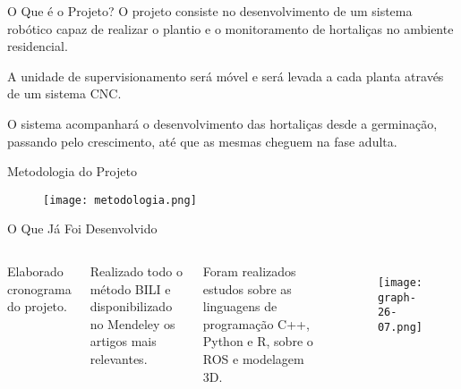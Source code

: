 \begin{frame}[t]{O Que é o Projeto?}
    \newcommand\vertspaceoque{0.35cm}
    O projeto consiste no desenvolvimento de um sistema robótico capaz de realizar o plantio e o monitoramento de hortaliças no ambiente residencial.
    \vspace*{\vertspaceoque}

    A unidade de supervisionamento será móvel e será levada a cada planta através de um sistema CNC.
    \vspace*{\vertspaceoque}

    O sistema acompanhará o desenvolvimento das hortaliças desde a germinação, passando pelo crescimento, até que as mesmas cheguem na fase adulta.
    \vspace*{\vertspaceoque}
\end{frame}

\begin{frame}[t]{Metodologia do Projeto}
    \begin{figure}
        \texttt{[image: metodologia.png]}
    \end{figure}
\end{frame}

\begin{frame}[t]{O Que Já Foi Desenvolvido}
    \newcommand\vertspacedesenv{0.35cm}

    \begin{columns}[t]
            Elaborado cronograma do projeto.
            \vspace*{\vertspacedesenv}
        
            Realizado todo o método BILI e disponibilizado no Mendeley os artigos mais relevantes.
            \vspace*{\vertspacedesenv}
        
            Foram realizados estudos sobre as linguagens de programação C++, Python e R, sobre o ROS e modelagem 3D.
            \vspace*{\vertspacedesenv}
            \begin{figure}[H]
                \vspace{-0.9cm}
                \texttt{[image: graph-26-07.png]}
            \end{figure}
    \end{columns}

    
\end{frame}

